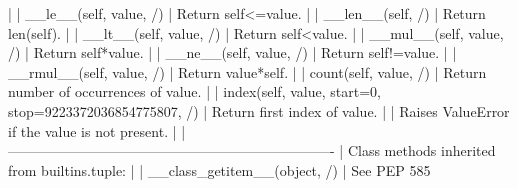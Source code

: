 \documentclass{article}
\begin{document}
     |
     |  __le__(self, value, /)
     |      Return self<=value.
     |
     |  __len__(self, /)
     |      Return len(self).
     |
     |  __lt__(self, value, /)
     |      Return self<value.
     |
     |  __mul__(self, value, /)
     |      Return self*value.
     |
     |  __ne__(self, value, /)
     |      Return self!=value.
     |
     |  __rmul__(self, value, /)
     |      Return value*self.
     |
     |  count(self, value, /)
     |      Return number of occurrences of value.
     |
     |  index(self, value, start=0, stop=9223372036854775807, /)
     |      Return first index of value.
     |
     |      Raises ValueError if the value is not present.
     |
     |  ----------------------------------------------------------------------
     |  Class methods inherited from builtins.tuple:
     |
     |  __class_getitem__(object, /)
     |      See PEP 585
\end{document}
